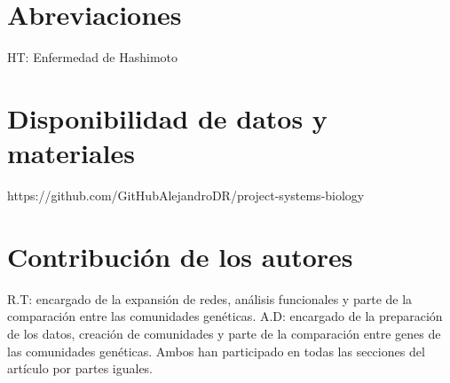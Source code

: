 \documentclass{bmcart}
\begin{document}
	\begin{backmatter}
	
		\section*{Abreviaciones}%
			HT: Enfermedad de Hashimoto
		
		\section*{Disponibilidad de datos y materiales}%
			https://github.com/GitHubAlejandroDR/project-systems-biology
		
		\section*{Contribución de los autores}
			R.T: encargado de la expansión de redes, análisis funcionales y parte de la comparación entre las comunidades genéticas.
            A.D: encargado de la preparación de los datos, creación de comunidades y parte de la comparación entre genes de las comunidades genéticas.
            Ambos han participado en todas las secciones del artículo por partes iguales.
		
		
		
	
	\end{backmatter}
\end{document}
